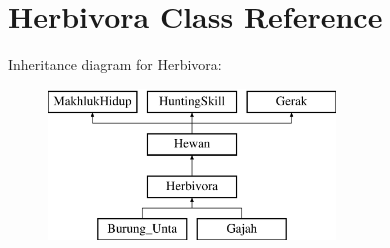 \hypertarget{class_herbivora}{}\section{Herbivora Class Reference}
\label{class_herbivora}
Inheritance diagram for Herbivora\+:\begin{figure}[H]
\begin{center}
\leavevmode
\includegraphics[height=4.000000cm]{class_herbivora}
\end{center}
\end{figure}
